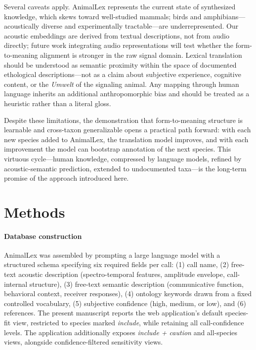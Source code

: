 \documentclass[external]{esp-paper}
\newcommand{\dbname}{AnimalLex\xspace}
\begin{document}
Several caveats apply. \dbname represents the current state of synthesized knowledge, which skews toward well-studied mammals; birds and amphibians---acoustically diverse and experimentally tractable---are underrepresented. Our acoustic embeddings are derived from textual descriptions, not from audio directly; future work integrating audio representations \cite{hagiwara2022avesanimalvocalizationencoder,robinson2025naturelmaudio} will test whether the form-to-meaning alignment is stronger in the raw signal domain. Lexical translation should be understood as semantic proximity within the space of documented ethological descriptions---not as a claim about subjective experience, cognitive content, or the \textit{Umwelt} of the signaling animal. Any mapping through human language inherits an additional anthropomorphic bias and should be treated as a heuristic rather than a literal gloss.

Despite these limitations, the demonstration that form-to-meaning structure is learnable and cross-taxon generalizable opens a practical path forward: with each new species added to \dbname, the translation model improves, and with each improvement the model can bootstrap annotation of the next species. This virtuous cycle---human knowledge, compressed by language models, refined by acoustic-semantic prediction, extended to undocumented taxa---is the long-term promise of the approach introduced here.

\section{Methods}

\paragraph{Database construction}
\dbname was assembled by prompting a large language model with a structured schema specifying six required fields per call: (1) call name, (2) free-text acoustic description (spectro-temporal features, amplitude envelope, call-internal structure), (3) free-text semantic description (communicative function, behavioral context, receiver responses), (4) ontology keywords drawn from a fixed controlled vocabulary, (5) subjective confidence (high, medium, or low), and (6) references. The present manuscript reports the web application's default species-fit view, restricted to species marked \emph{include}, while retaining all call-confidence levels. The application additionally exposes \emph{include + caution} and all-species views, alongside confidence-filtered sensitivity views.
\end{document}
